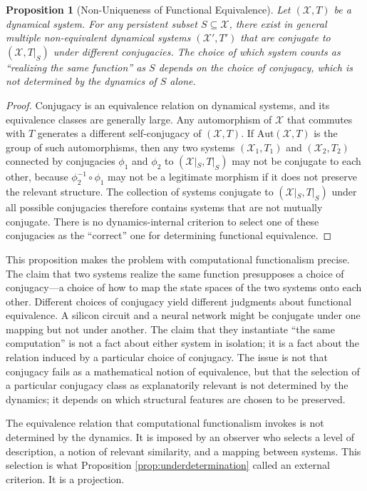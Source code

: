 \documentclass[12pt, a4paper, oneside]{article}
\theoremstyle{plain}
\newtheorem{proposition}[theorem]{Proposition}
\theoremstyle{definition}
\theoremstyle{remark}
\newcommand{\X}{\mathcal{X}}
\newcommand{\T}{T}
\begin{document}
\begin{proposition}[Non-Uniqueness of Functional Equivalence]
\label{prop:non-unique}
Let $(\X, \T)$ be a dynamical system. For any persistent subset $S \subseteq \X$, there exist in general multiple non-equivalent dynamical systems $(\X', \T')$ that are conjugate to $(\X, \T|_S)$ under different conjugacies. The choice of which system counts as ``realizing the same function'' as $S$ depends on the choice of conjugacy, which is not determined by the dynamics of $S$ alone.
\end{proposition}

\begin{proof}
Conjugacy is an equivalence relation on dynamical systems, and its equivalence classes are generally large. Any automorphism of $\X$ that commutes with $\T$ generates a different self-conjugacy of $(\X, \T)$. If $\mathrm{Aut}(\X, \T)$ is the group of such automorphisms, then any two systems $(\X_1, \T_1)$ and $(\X_2, \T_2)$ connected by conjugacies $\phi_1$ and $\phi_2$ to $(\X|_S, \T|_S)$ may not be conjugate to each other, because $\phi_2^{-1} \circ \phi_1$ may not be a legitimate morphism if it does not preserve the relevant structure. The collection of systems conjugate to $(\X|_S, \T|_S)$ under all possible conjugacies therefore contains systems that are not mutually conjugate. There is no dynamics-internal criterion to select one of these conjugacies as the ``correct'' one for determining functional equivalence.
\end{proof}

This proposition makes the problem with computational functionalism precise. The claim that two systems realize the same function presupposes a choice of conjugacy---a choice of how to map the state spaces of the two systems onto each other. Different choices of conjugacy yield different judgments about functional equivalence. A silicon circuit and a neural network might be conjugate under one mapping but not under another. The claim that they instantiate ``the same computation'' is not a fact about either system in isolation; it is a fact about the relation induced by a particular choice of conjugacy. The issue is not that conjugacy fails as a mathematical notion of equivalence, but that the selection of a particular conjugacy class as explanatorily relevant is not determined by the dynamics; it depends on which structural features are chosen to be preserved.

The equivalence relation that computational functionalism invokes is not determined by the dynamics. It is imposed by an observer who selects a level of description, a notion of relevant similarity, and a mapping between systems. This selection is what Proposition \ref{prop:underdetermination} called an external criterion. It is a projection.
\end{document}
